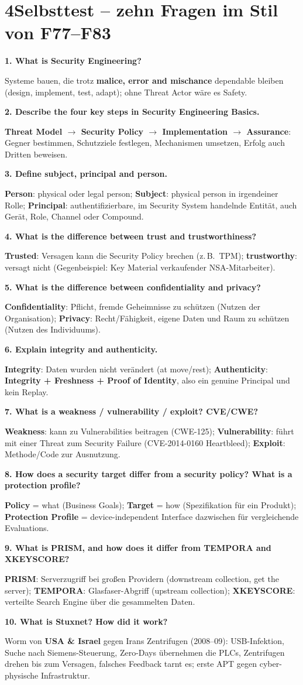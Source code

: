 \documentclass[10pt,a4paper]{article}
\newcommand{\qa}[3]{\par\vspace{2.5pt}\textbf{#1. #2}\par\nopagebreak #3\par}
\begin{document}
\section*{4\quad Selbsttest -- zehn Fragen im Stil von F77--F83}
\qa{1}{What is Security Engineering?}{Systeme bauen, die trotz \textbf{malice, error and mischance} dependable bleiben (design, implement, test, adapt); ohne Threat Actor wäre es Safety.}
\qa{2}{Describe the four key steps in Security Engineering Basics.}{\textbf{Threat Model $\rightarrow$ Security Policy $\rightarrow$ Implementation $\rightarrow$ Assurance}: Gegner bestimmen, Schutzziele festlegen, Mechanismen umsetzen, Erfolg auch Dritten beweisen.}
\qa{3}{Define subject, principal and person.}{\textbf{Person}: physical oder legal person; \textbf{Subject}: physical person in irgendeiner Rolle; \textbf{Principal}: authentifizierbare, im Security System handelnde Entität, auch Gerät, Role, Channel oder Compound.}
\qa{4}{What is the difference between trust and trustworthiness?}{\textbf{Trusted}: Versagen kann die Security Policy brechen (z.\,B.\ TPM); \textbf{trustworthy}: versagt nicht (Gegenbeispiel: Key Material verkaufender NSA-Mitarbeiter).}
\qa{5}{What is the difference between confidentiality and privacy?}{\textbf{Confidentiality}: Pflicht, fremde Geheimnisse zu schützen (Nutzen der Organisation); \textbf{Privacy}: Recht/Fähigkeit, eigene Daten und Raum zu schützen (Nutzen des Individuums).}
\qa{6}{Explain integrity and authenticity.}{\textbf{Integrity}: Daten wurden nicht verändert (at move/rest); \textbf{Authenticity}: \textbf{Integrity + Freshness + Proof of Identity}, also ein genuine Principal und kein Replay.}
\qa{7}{What is a weakness / vulnerability / exploit? CVE/CWE?}{\textbf{Weakness}: kann zu Vulnerabilities beitragen (CWE-125); \textbf{Vulnerability}: führt mit einer Threat zum Security Failure (CVE-2014-0160 Heartbleed); \textbf{Exploit}: Methode/Code zur Ausnutzung.}
\qa{8}{How does a security target differ from a security policy? What is a protection profile?}{\textbf{Policy} = what (Business Goals); \textbf{Target} = how (Spezifikation für ein Produkt); \textbf{Protection Profile} = device-independent Interface dazwischen für vergleichende Evaluations.}
\qa{9}{What is PRISM, and how does it differ from TEMPORA and XKEYSCORE?}{\textbf{PRISM}: Serverzugriff bei großen Providern (downstream collection, \glqq get the server\grqq); \textbf{TEMPORA}: Glasfaser-Abgriff (upstream collection); \textbf{XKEYSCORE}: verteilte Search Engine über die gesammelten Daten.}
\qa{10}{What is Stuxnet? How did it work?}{Worm von \textbf{USA \& Israel} gegen Irans Zentrifugen (2008--09): USB-Infektion, Suche nach Siemens-Steuerung, Zero-Days übernehmen die PLCs, Zentrifugen drehen bis zum Versagen, falsches Feedback tarnt es; erste APT gegen cyber-physische Infrastruktur.}
\end{document}
